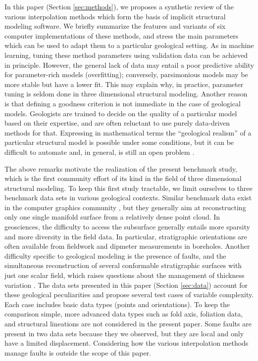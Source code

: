 \documentclass[final]{ring20}
\begin{document}
In this paper (Section \ref{sec:methods}), we proposes a synthetic review of the various interpolation methods which form the basis of implicit structural modeling software. We briefly summarize the features and variants of six computer implementations of these methods, and stress the main parameters which can be used to adapt them to a particular geological setting. As in machine learning, tuning these method parameters using validation data can be achieved in principle. However, the general lack of data may entail a poor predictive ability for parameter-rich models (overfitting); conversely, parsimonious models may be more stable but have a lower fit. This may explain why, in practice, parameter tuning is seldom done in three dimensional structural modeling. Another reason is that defining a goodness criterion is not immediate in the case of geological models. Geologists are trained to decide on the quality of a particular model based on their expertise, and are often reluctant to use purely data-driven methods for that. Expressing in mathematical terms the ``geological realism'' of a particular structural model is possible under some conditions, but it can be difficult to automate and, in general, is still an open problem \citep{Caumon2010MG}. 

The above remarks motivate the realization of the present benchmark study, which is the first community effort of its kind in the field of three dimensional structural modeling. To keep this first study tractable, we limit ourselves to three benchmark data sets in various geological contexts. Similar benchmark data exist in the computer graphics community \citep[e.g.,][]{BLNTS13}, but they generally aim at reconstructing only one single manifold surface from a relatively dense point cloud. In geosciences, the difficulty to access the subsurface generally entails more sparsity and more diversity in the field data. In particular, stratigraphic orientations are often available from fieldwork and dipmeter measurements in boreholes. Another difficulty specific to geological modeling is the presence of faults, and the simultaneous reconstruction of several conformable stratigraphic surfaces with just one scalar field, which raises questions about the management of thickness variation \citep{Laurent2016MG}. The data sets presented in this paper (Section \ref{sec:data}) account for these geological peculiarities and propose several test cases of variable complexity. Each case includes basic data types (points and orientations). To keep the comparison simple, more advanced data types such as fold axis, foliation data, and structural lineations are not considered in the present paper. Some faults are present in two data sets because they we observed, but they are local and only have a limited displacement. Considering how the various interpolation methods manage faults is outside the scope of this paper. 
\end{document}
